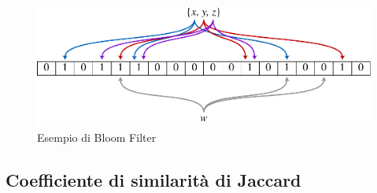 \documentclass[a4paper, 12pt, oneside]{book}
\theoremstyle{normal}
\begin{document}
\begin{figure}[h]
  \centering
  \includegraphics[width=\textwidth]{img/Bloom_filter.pdf}
  \caption{Esempio di Bloom Filter \cite{svgbloomfilter}}
\end{figure}

\subsection{Coefficiente di similarità di Jaccard}
\end{document}
